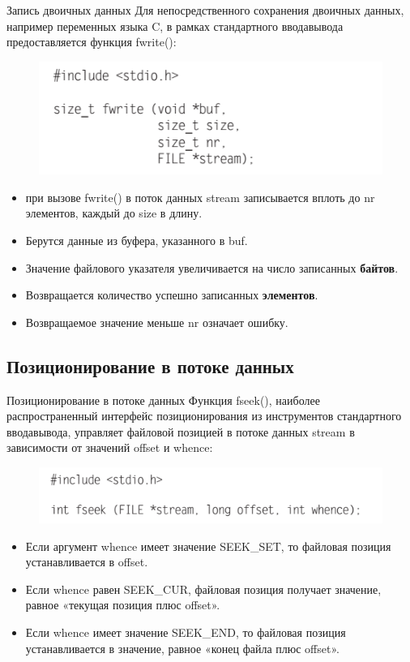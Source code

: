 \documentclass{beamer}
\begin{document}
\begin{frame}{Запись двоичных данных}
Для непосредственного сохранения двоичных данных, например переменных языка C, в рамках стандартного ввода­вывода предоставляется функция fwrite():
\begin{figure}[h]
\centering
\includegraphics[scale=0.6]{images/lec05-pic21.png}
\end{figure}
\begin{itemize}
\item при вызове fwrite() в поток данных stream записывается вплоть до nr элементов,
каждый до size в длину. 
\item Берутся данные из буфера, указанного в buf. 
\item Значение файлового указателя увеличивается на число записанных \textbf{байтов}.
\item Возвращается количество успешно записанных \textbf{элементов}. 
\item  Возвращаемое значение меньше nr означает ошибку.
\end{itemize}
\end{frame}

\subsection{Позиционирование в потоке данных}

\begin{frame}{Позиционирование в потоке данных}
Функция fseek(), наиболее распространенный интерфейс позиционирования из инструментов стандартного ввода­вывода,
управляет файловой позицией в потоке данных stream в зависимости от значений offset и whence:
\begin{figure}[h]
\centering
\includegraphics[scale=0.6]{images/lec05-pic22.png}
\end{figure}
\begin{itemize}
\item Если аргумент whence имеет значение SEEK\_SET, то файловая позиция устанавливается в offset. 
\item Если whence равен SEEK\_CUR, файловая позиция получает значение, равное «текущая позиция плюс offset». 
\item Если whence имеет значение SEEK\_END, то файловая позиция устанавливается в значение, равное «конец файла плюс
offset».
\end{itemize}
\end{frame}
\end{document}
